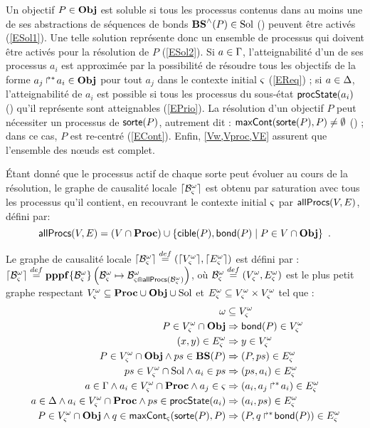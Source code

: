 Un objectif $P \in \mathbf{Obj}$ est soluble si tous les processus contenus dans au moins une de ses
abstractions de séquences de bonds $\mathbf{BS}^\wedge(P) \in \mathrm{Sol}$ (\cf {})
peuvent être activés (\eqref{ESol1}).
Une telle solution représente donc un ensemble de processus qui doivent être activés
pour la résolution de $P$ (\eqref{ESol2}).
Si $a \in \Gamma$, l'atteignabilité d'un de ses processus $a_i$ est approximée par
la possibilité de résoudre tous les objectifs de la forme $\mbox{${a}_{j}\Rsh^*\!{a}_{i}$} \in \mathbf{Obj}$
pour tout $a_j$ dans le contexte initial $\varsigma$ (\eqref{EReq}) ;
si $a \in \Delta$, l'atteignabilité de $a_i$ est possible si tous les processus du sous-état
$\mathsf{procState}(a_i)$ (\cf {}) qu'il représente sont atteignables (\eqref{EPrio}).
La résolution d'un objectif $P$ peut nécessiter un processus de $\mathsf{sorte}(P)$,
autrement dit : $\mathsf{maxCont}(\mathsf{sorte}(P), P) \neq \emptyset$ (\cf {}) ;
dans ce cas, $P$ est re-centré (\eqref{ECont}).
Enfin, \eqref{Vw,Vproc,VE} assurent que l'ensemble des nœuds est complet.

Étant donné que le processus actif de chaque sorte peut évoluer au cours de la résolution,
le graphe de causalité locale $\lceil \mathcal{B}_\varsigma^\omega\rceil$ est obtenu par saturation avec tous les processus
qu'il contient, \cad en recouvrant le contexte initial $\varsigma$ par $\mathsf{allProcs}(V, E)$, défini par:
  \[\mathsf{allProcs}(V, E) = (V \cap \mathbf{Proc}) \cup
    \{ \mathsf{cible}(P), \mathsf{bond}(P) \mid P \in V \cap \mathbf{Obj} \} \enspace.\]

\begin{definition}
  Le graphe de causalité locale $\lceil \mathcal{B}_\varsigma^\omega\rceil \stackrel{def}= (\lceil V_\varsigma^\omega\rceil, \lceil E_\varsigma^\omega\rceil)$ est défini par :
  $\lceil \mathcal{B}_\varsigma^\omega\rceil \stackrel{def}= \mathbf{pppf}\{\mathcal{B}^\omega_\varsigma\}\left(\mathcal{B}^\omega_\varsigma\mapsto\mathcal{B}^\omega_{\varsigma \Cap \mathsf{allProcs}(\mathcal{B}^\omega_\varsigma)}\right)$,
  où $\mathcal{B}^\omega_\varsigma \stackrel{def}= (V_\varsigma^\omega, E_\varsigma^\omega)$ est le plus petit graphe respectant
  $V_\varsigma^\omega \subseteq \mathbf{Proc} \cup \mathbf{Obj} \cup \mathrm{Sol}$ et $E_\varsigma^\omega \subseteq V_\varsigma^\omega \times V_\varsigma^\omega$
  tel que :
  \begin{align}
    \omega &\subseteq V_\varsigma^\omega \label{eq:Vw} \\
    P \in V_\varsigma^\omega \cap \mathbf{Obj} &\Rightarrow \mathsf{bond}(P) \in V_\varsigma^\omega \label{eq:Vproc} \\
    (x, y) \in E_\varsigma^\omega &\Rightarrow y \in V_\varsigma^\omega \label{eq:VE} \\
    P \in V_\varsigma^\omega \cap \mathbf{Obj} \wedge ps \in \mathbf{BS}(P) &\Rightarrow (P, ps) \in E_\varsigma^\omega \label{eq:ESol1} \\
    ps \in V_\varsigma^\omega \cap \mathrm{Sol} \wedge a_i \in ps &\Rightarrow (ps, a_i) \in E_\varsigma^\omega \label{eq:ESol2} \\
    a \in \Gamma \wedge a_i \in V_\varsigma^\omega \cap \mathbf{Proc} \wedge a_j \in \varsigma &\Rightarrow (a_i, \mbox{${a}_{j}\Rsh^*\!{a}_{i}$}) \in E_\varsigma^\omega \label{eq:EReq} \\
    a \in \Delta \wedge a_i \in V_\varsigma^\omega \cap \mathbf{Proc} \wedge ps \in \mathsf{procState}(a_i) &\Rightarrow (a_i, ps) \in E_\varsigma^\omega \label{eq:EPrio} \\
    P \in V_\varsigma^\omega \cap \mathbf{Obj} \wedge q \in \mathsf{maxCont}_\varsigma(\mathsf{sorte}(P), P) &\Rightarrow (P, \mbox{$q\Rsh^*\!\mathsf{bond}(P)$}) \in E_\varsigma^\omega \label{eq:ECont} \!
  \end{align}
\end{definition}

